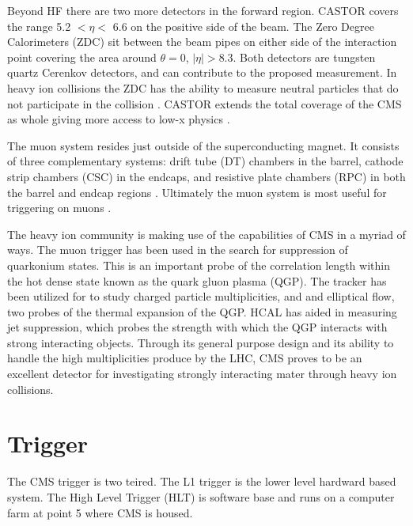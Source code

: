 Beyond HF there are two more detectors in the forward region.
CASTOR covers the range 5.2 $< \eta <$ 6.6 on the positive side of the beam. 
The Zero Degree Calorimeters (ZDC) sit between the beam pipes on either side of
	the interaction point covering the area around $\theta = 0$, $|\eta| > 
	8.3$.
Both detectors are tungsten quartz Cerenkov detectors, and can contribute to
	the proposed measurement.
In heavy ion collisions the ZDC has the ability to measure neutral particles 
	that do not participate in the collision \cite{tCmsE}.
CASTOR extends the total coverage of the CMS as whole giving more access to 
	low-x physics \cite{tCmsE}.

The muon system resides just outside of the superconducting magnet.
It consists of three complementary systems: drift tube (DT) chambers in the
	barrel, cathode strip chambers (CSC) in the endcaps, and resistive 
	plate chambers (RPC) in both the barrel and endcap regions \cite{tCmsE}.
Ultimately the muon system is most useful for triggering on muons \cite{tCmsE}.

The heavy ion community is making use of the capabilities of CMS in a myriad of
	ways.
The muon trigger has been used in the search for suppression of quarkonium 
	states. 
This is an important probe of the correlation length within the hot dense state
	known as the quark gluon plasma (QGP).
The tracker has been utilized for to study charged particle multiplicities, and
	and elliptical flow, two probes of the thermal expansion of the QGP.
HCAL has aided in measuring jet suppression, which probes the strength with 
	which the QGP interacts with strong interacting objects.
Through its general purpose design and its ability to handle the high
	multiplicities produce by the LHC, CMS proves to be an excellent 
	detector for investigating strongly interacting mater through heavy ion
	collisions. 
  \section{Trigger}
    The CMS trigger is two teired. 
    The L1 trigger is the lower level hardward based system. 
    The High Level Trigger (HLT) is software base and runs on a computer farm
      at point 5 where CMS is housed. 
